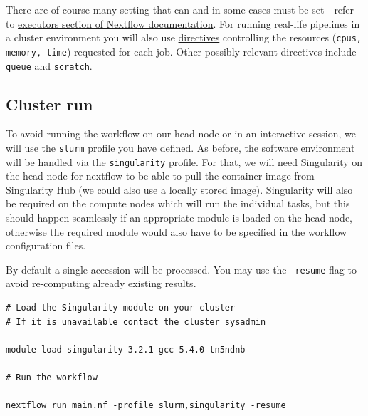 

There are of course many setting that can and in some cases must be set - refer to \href{https://www.nextflow.io/docs/latest/executor.html}{executors section of Nextflow documentation}. 
For running real-life pipelines in a cluster environment you will also use \href{https://www.nextflow.io/docs/latest/process.html#directives}{directives} controlling the resources (\texttt{cpus, memory, time}) requested for each job. Other possibly relevant directives include \texttt{queue} and \texttt{scratch}.



\subsection{Cluster run}


To avoid running the workflow on our head node or in an interactive session, we will use the \texttt{slurm} profile you have defined.
As before, the software environment will be handled via the \texttt{singularity} profile. 
For that, we will need Singularity on the head node for nextflow to be able to pull the container image from Singularity Hub (we could also use a locally stored image). Singularity will also be required on the compute nodes which will run the individual tasks, but this should happen seamlessly if an appropriate module is loaded on the head node, otherwise the required module would also have to be specified in the workflow configuration files. 

\begin{steps}
By default a single accession will be processed. 
You may use the \texttt{-resume} flag to avoid re-computing already existing results. 


\begin{lstlisting}
# Load the Singularity module on your cluster
# If it is unavailable contact the cluster sysadmin

module load singularity-3.2.1-gcc-5.4.0-tn5ndnb

# Run the workflow

nextflow run main.nf -profile slurm,singularity -resume
\end{lstlisting}
\end{steps}



